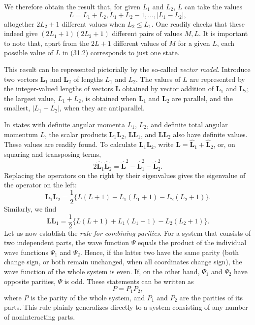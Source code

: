 We therefore obtain the result that, for given $L_1$ and $L_2$, $L$ can take
the values
\begin{equation}
  L=L_1+L_2,L_1+L_2-1,\ldots,|L_1-L_2|,
  \tag{31.2}
\end{equation}
altogether $2L_2+1$ different values when $L_2\leq L_1$. One readily checks
that these indeed give $(2L_1+1)(2L_2+1)$ different pairs of values $M,L$.
It is important to note that, apart from the $2L+1$ different values of $M$
for a given $L$, each possible value of $L$ in (31.2) corresponds to just one
state.

This result can be represented pictorially by the so-called
\emph{vector model}. Introduce two vectors $\mathbf L_1$ and $\mathbf L_2$
of lengths $L_1$ and $L_2$. The values of $L$ are represented by the
integer-valued lengths of vectors $\mathbf L$ obtained by vector addition of
$\mathbf L_1$ and $\mathbf L_2$; the largest value, $L_1+L_2$, is obtained
when $\mathbf L_1$ and $\mathbf L_2$ are parallel, and the smallest,
$|L_1-L_2|$, when they are antiparallel.

In states with definite angular momenta $L_1$, $L_2$, and definite total
angular momentum $L$, the scalar products $\mathbf L_1\mathbf L_2$,
$\mathbf L\mathbf L_1$, and $\mathbf L\mathbf L_2$ also have definite
values. These values are readily found. To calculate
$\mathbf L_1\mathbf L_2$, write
$\hat{\mathbf L}=\hat{\mathbf L}_1+\hat{\mathbf L}_2$, or, on squaring and
transposing terms,
\[
  2\hat{\mathbf L}_1\hat{\mathbf L}_2
  =\hat{\mathbf L}^{2}-\hat{\mathbf L}_1^{2}-\hat{\mathbf L}_2^{2}.
\]
Replacing the operators on the right by their eigenvalues gives the
eigenvalue of the operator on the left:
\begin{equation}
 \mathbf L_1\mathbf L_2=\frac12
 \{L(L+1)-L_1(L_1+1)-L_2(L_2+1)\}.
 \tag{31.3}
\end{equation}
Similarly, we find
\begin{equation}
 \mathbf L\mathbf L_1=\frac12
 \{L(L+1)+L_1(L_1+1)-L_2(L_2+1)\}.
 \tag{31.4}
\end{equation}
Let us now establish the \emph{rule for combining parities}. For a system
that consists of two independent parts, the wave function $\Psi$ equals the
product of the individual wave functions $\Psi_1$ and $\Psi_2$. Hence, if the latter two
have the same parity (both change sign, or both remain unchanged, when all
coordinates change sign), the wave function of the whole system is even. If,
on the other hand, $\Psi_1$ and $\Psi_2$ have opposite parities, $\Psi$ is
odd. These statements can be written as
\begin{equation}
  P=P_1P_2,
  \tag{31.5}
\end{equation}
where $P$ is the parity of the whole system, and $P_1$ and $P_2$ are the
parities of its parts. This rule plainly generalizes directly to a system
consisting of any number of noninteracting parts.

